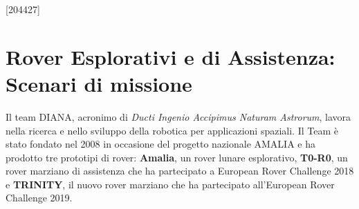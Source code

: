 \documentclass[%
corpo=11pt,
twoside,
 stile=classica,
oldstyle,
greek,%
]{toptesi}
\begin{document}



\begin{frontespizio}
\nomeateneo{}%
\FacoltaDi{}%
\facolta[III]{}%
\renewcommand*\IDlabel{\\\quad matricola: }%
[204427]%
\end{frontespizio}



\ringraziamenti %




\mainmatter
\indici
\chapter{Rover Esplorativi e di Assistenza: Scenari di missione}
Il team DIANA, acronimo di  \textit{Ducti Ingenio Accipimus Naturam Astrorum}, lavora nella ricerca e nello sviluppo della robotica per applicazioni spaziali.
Il Team è stato fondato nel 2008 in occasione del progetto nazionale AMALIA e ha prodotto tre prototipi di rover: \textbf{Amalia}, un rover lunare esplorativo, \textbf{T0-R0}, un rover marziano di assistenza che ha partecipato a European Rover Challenge 2018 e \textbf{TRINITY}, il nuovo rover marziano che ha partecipato all'European Rover Challenge 2019.
\end{document}
